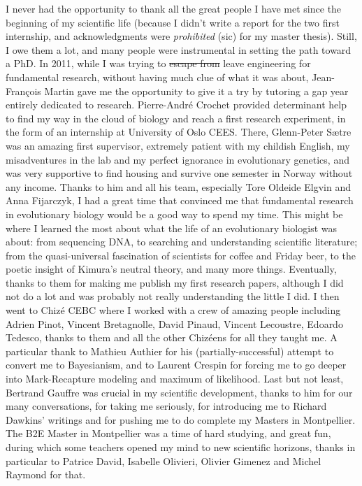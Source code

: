 I never had the opportunity to thank all the great people I have met since the beginning of my scientific life (because I didn't write a report for the two first internship, and acknowledgments were \textit{prohibited} (sic) for my master thesis). Still, I owe them a lot, and many people were instrumental in setting the path toward a PhD. 
In 2011, while I was trying to \sout{escape from} leave engineering for fundamental research, without having much clue of what it was about, Jean-Fran\c{c}ois Martin gave me the opportunity to give it a try by tutoring a gap year entirely dedicated to research. Pierre-Andr\'{e} Crochet provided determinant help to find my way in the cloud of biology and reach a first research experiment, in the form of an internship at University of Oslo CEES. There, Glenn-Peter S{\ae}tre was an amazing first supervisor, extremely patient with my childish English, my misadventures in the lab and my perfect ignorance in evolutionary genetics, and was very supportive to find housing and survive one semester in Norway without any income. Thanks to him and all his team, especially Tore Oldeide Elgvin and Anna Fijarczyk, I had a great time that convinced me that fundamental research in evolutionary biology would be a good way to spend my time. This might be where I learned the most about what the life of an evolutionary biologist was about: from sequencing DNA, to searching and understanding scientific literature; from the quasi-universal fascination of scientists for coffee and Friday beer, to the poetic insight of Kimura's neutral theory, and many more things. Eventually, thanks to them for making me publish my first research papers, although I did not do a lot and was probably not really understanding the little I did. 
I then went to Chiz\'{e} CEBC where I worked with a crew of amazing people including Adrien Pinot, Vincent Bretagnolle, David Pinaud, Vincent Lecoustre, Edoardo Tedesco, thanks to them and all the other Chiz\'eens for all they taught me. A particular thank to Mathieu Authier for his (partially-successful) attempt to convert me to Bayesianism, and to Laurent Crespin for forcing me to go deeper into Mark-Recapture modeling and maximum of likelihood. Last but not least, Bertrand Gauffre was crucial in my scientific development, thanks to him for our many conversations, for taking me seriously, for introducing me to Richard Dawkins' writings and for pushing me to do complete my Masters in Montpellier. 
The B2E Master in Montpellier was a time of hard studying, and great fun, during which some teachers opened my mind to new scientific horizons, thanks in particular to Patrice David, Isabelle Olivieri, Olivier Gimenez and Michel Raymond for that.
